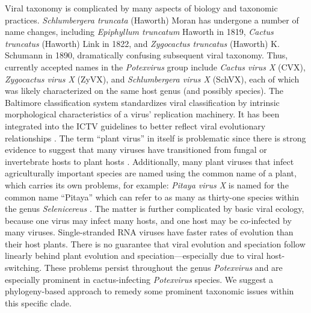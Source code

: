 \documentclass[fleqn,10pt,lineno]{wlpeerj}
\begin{document}
Viral taxonomy is complicated by many aspects of biology and taxonomic practices.
\textit{Schlumbergera truncata} (Haworth) Moran has undergone a number of name changes, including \textit{Epiphyllum truncatum} Haworth in 1819, \textit{Cactus truncatus} (Haworth) Link in 1822, and \textit{Zygocactus truncatus} (Haworth) K. Schumann in 1890, dramatically confusing subsequent viral taxonomy.
Thus, currently accepted names in the \textit{Potexvirus} group include \textit{Cactus virus X} (CVX), \textit{Zygocactus virus X} (ZyVX), and \textit{Schlumbergera virus X} (SchVX), each of which was likely characterized on the same host genus (and possibly species). %
The Baltimore classification system standardizes viral classification by intrinsic morphological characteristics of a virus' replication machinery. 
It has been integrated into the ICTV guidelines to better reflect viral evolutionary relationships \citep{ictv2020}.
The term ``plant virus'' in itself is problematic since there is strong evidence to suggest that many viruses have transitioned from fungal or invertebrate hosts to plant hosts \citep{lefeuvre2019}. %
Additionally, many plant viruses that infect agriculturally important species are named using the common name of a plant, which carries its own problems, for example: \textit{Pitaya virus X} is named for the common name ``Pitaya'' which can refer to as many as thirty-one species within the genus \textit{Selenicereus} \citep{korotkova_phylogenetic_2017,guerrero_phylogenetic_2019,le_bellec_12_2011}. 
The matter is further complicated by basic viral ecology, because one virus may infect many hosts, and one host may be co-infected by many viruses. 
Single-stranded RNA viruses have faster rates of evolution than their host plants. %
There is no guarantee that viral evolution and speciation follow linearly behind plant evolution and speciation---especially due to viral host-switching.
These problems persist throughout the genus \textit{Potexvirus} and are especially prominent in cactus-infecting \textit{Potexvirus} species.
We suggest a phylogeny-based approach to remedy some prominent taxonomic issues within this specific clade.
\end{document}

